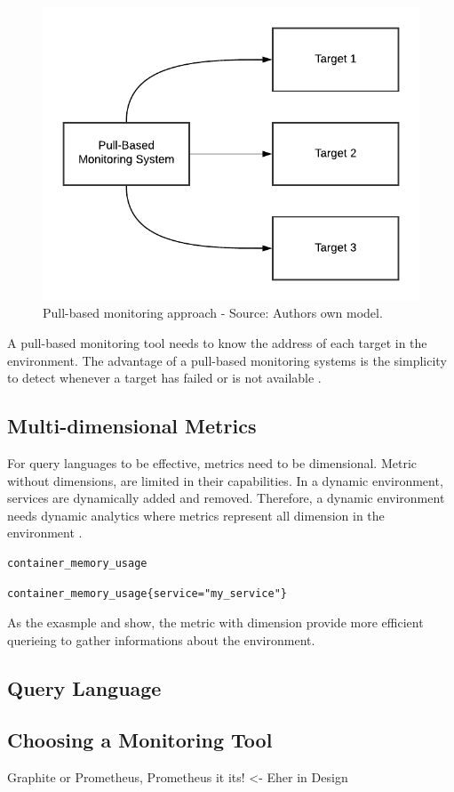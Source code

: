 \begin{figure}[h]
\centering
\includegraphics[scale=0.8]{images/02_theoretical_foundation/monitoring/pull_based}
\caption{Pull-based monitoring approach - Source: Authors own model.}
\label{fig:mon_pull-based}
\end{figure}
A pull-based monitoring tool needs to know the address of each target in the environment.
The advantage of a pull-based monitoring systems is the simplicity to detect whenever a target has failed or is not available \cite{Farcic2017Toolkit21}.


\subsection{Multi-dimensional Metrics}
\label{subsec:02_monitoring_db_multi-metrics}
For query languages to be effective, metrics need to be dimensional. Metric without dimensions, are limited in their capabilities.
In a dynamic environment, services are dynamically added and removed. Therefore, a dynamic environment needs dynamic analytics where metrics represent all dimension in the environment \cite{Farcic2018Toolkit22}.
\begin{lstlisting}[frame=single, label=lst:mon_metr_dimless, caption=Example of a dimensionless-metric, captionpos=b]
container_memory_usage
\end{lstlisting}
\begin{lstlisting}[frame=single, label=lst:mon_metr_withdim, caption=Example of a metric with dimensions, captionpos=b]
container_memory_usage{service="my_service"}
\end{lstlisting}
As the exasmple  and  show, the metric with dimension provide more efficient querieing to gather informations about the environment.


\subsection{Query Language}



\subsection{Choosing a Monitoring Tool}
Graphite or Prometheus, Prometheus it its! <- Eher in Design
